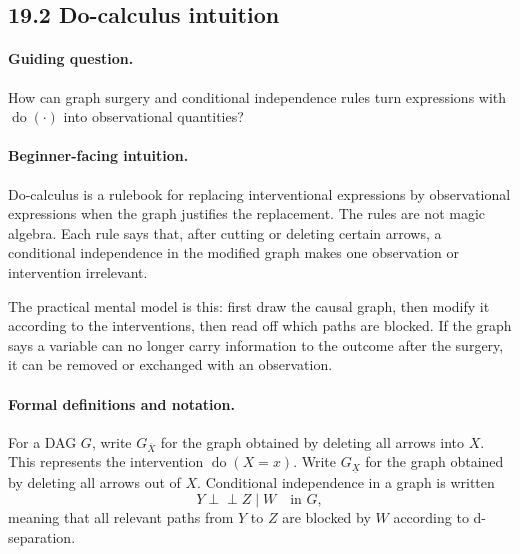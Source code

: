 \subsection{19.2 Do-calculus intuition}

\paragraph{Guiding question.}
How can graph surgery and conditional independence rules turn expressions with \(\operatorname{do}(\cdot)\) into observational quantities?

\paragraph{Beginner-facing intuition.}
Do-calculus is a rulebook for replacing interventional expressions by observational expressions when the graph justifies the replacement. The rules are not magic algebra. Each rule says that, after cutting or deleting certain arrows, a conditional independence in the modified graph makes one observation or intervention irrelevant.

The practical mental model is this: first draw the causal graph, then modify it according to the interventions, then read off which paths are blocked. If the graph says a variable can no longer carry information to the outcome after the surgery, it can be removed or exchanged with an observation.

\paragraph{Formal definitions and notation.}
For a DAG \(G\), write \(G_{\bar X}\) for the graph obtained by deleting all arrows into \(X\). This represents the intervention \(\operatorname{do}(X=x)\). Write \(G_{\underline X}\) for the graph obtained by deleting all arrows out of \(X\). Conditional independence in a graph is written
\[
Y\perp\!\!\!\perp Z\mid W \quad \text{in }G,
\]
meaning that all relevant paths from \(Y\) to \(Z\) are blocked by \(W\) according to d-separation.

